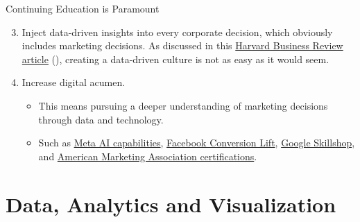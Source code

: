 \documentclass[pdf]{beamer}
\theoremstyle{remark}
\theoremstyle{definition}
\begin{document}
\begin{frame}[t]{Continuing Education is Paramount}
\begin{enumerate}
  \setcounter{enumi}{2}
\item Inject data-driven insights into every corporate decision, which obviously includes  marketing decisions.  As discussed in this \href{https://hbr.org/2020/02/10-steps-to-creating-a-data-driven-culture}{Harvard Business Review article} (\cite{waller2020}), creating a data-driven culture is not as easy as it would seem.
\item Increase digital acumen. 
\begin{itemize}
\item This means pursuing a deeper understanding of marketing decisions through data and technology.  
\item Such as \href{https://ai.facebook.com/tools/\#frameworks-and-tools}{Meta AI capabilities}, \href{https://www.facebook.com/business/m/one-sheeters/conversion-lift}{Facebook Conversion Lift}, \href{https://skillshop.exceedlms.com/student/catalog/browse}{Google Skillshop}, and \href{https://www.ama.org/certifications/}{American Marketing Association certifications}.
\end{itemize}
\end{enumerate}
\end{frame}

\section{Data, Analytics and Visualization}
\end{document}
